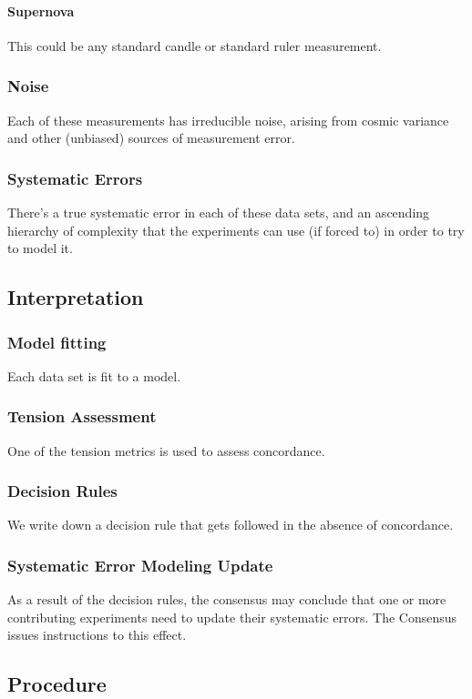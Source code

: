 \documentclass{article}
\begin{document}
\paragraph{Supernova}
This could be any standard candle or standard ruler measurement.

\subsubsection{Noise}
Each of these measurements has irreducible noise, arising from cosmic variance and other (unbiased) sources of measurement error.

\subsubsection{Systematic Errors}
There's a true systematic error in each of these data sets, and an ascending hierarchy of complexity that the experiments can use (if forced to) in order to try to model it.


\subsection{Interpretation}


\subsubsection{Model fitting}
Each data set is fit to a model.


\subsubsection{Tension Assessment}
One of the tension metrics is used to assess concordance.

\subsubsection{Decision Rules}
We write down a decision rule that gets followed in the absence of concordance.

\subsubsection{Systematic Error Modeling Update}
As a result of the decision rules, the consensus may conclude that one or more contributing experiments need to update their systematic errors. The Consensus issues instructions to this effect.
  

\subsection{Procedure} 
\end{document}

